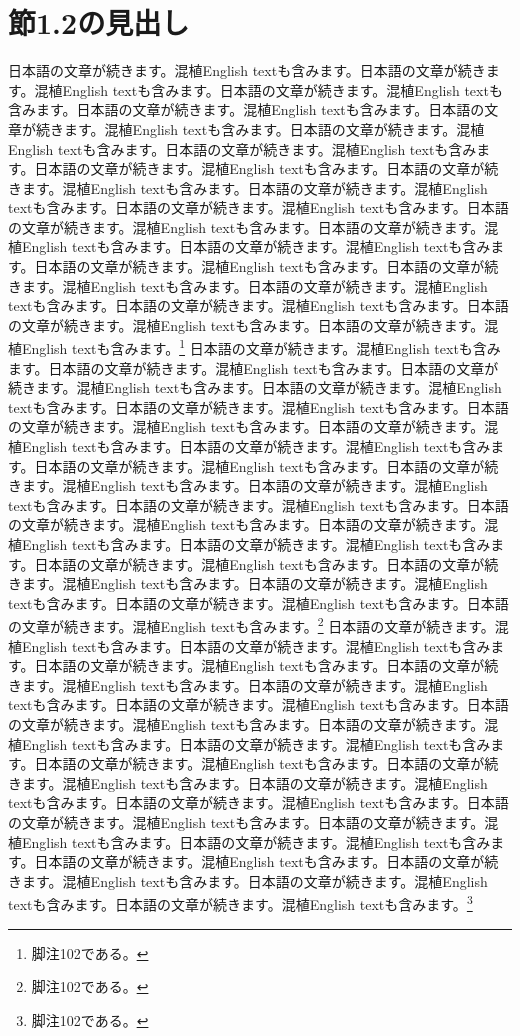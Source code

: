 \documentclass[pdflatex,book]{jlreq}
\begin{document}
\section{節1.2の見出し}
日本語の文章が続きます。混植English textも含みます。日本語の文章が続きます。混植English textも含みます。日本語の文章が続きます。混植English textも含みます。日本語の文章が続きます。混植English textも含みます。日本語の文章が続きます。混植English textも含みます。日本語の文章が続きます。混植English textも含みます。日本語の文章が続きます。混植English textも含みます。日本語の文章が続きます。混植English textも含みます。日本語の文章が続きます。混植English textも含みます。日本語の文章が続きます。混植English textも含みます。日本語の文章が続きます。混植English textも含みます。日本語の文章が続きます。混植English textも含みます。日本語の文章が続きます。混植English textも含みます。日本語の文章が続きます。混植English textも含みます。日本語の文章が続きます。混植English textも含みます。日本語の文章が続きます。混植English textも含みます。日本語の文章が続きます。混植English textも含みます。日本語の文章が続きます。混植English textも含みます。日本語の文章が続きます。混植English textも含みます。日本語の文章が続きます。混植English textも含みます。\footnote{脚注102である。}
日本語の文章が続きます。混植English textも含みます。日本語の文章が続きます。混植English textも含みます。日本語の文章が続きます。混植English textも含みます。日本語の文章が続きます。混植English textも含みます。日本語の文章が続きます。混植English textも含みます。日本語の文章が続きます。混植English textも含みます。日本語の文章が続きます。混植English textも含みます。日本語の文章が続きます。混植English textも含みます。日本語の文章が続きます。混植English textも含みます。日本語の文章が続きます。混植English textも含みます。日本語の文章が続きます。混植English textも含みます。日本語の文章が続きます。混植English textも含みます。日本語の文章が続きます。混植English textも含みます。日本語の文章が続きます。混植English textも含みます。日本語の文章が続きます。混植English textも含みます。日本語の文章が続きます。混植English textも含みます。日本語の文章が続きます。混植English textも含みます。日本語の文章が続きます。混植English textも含みます。日本語の文章が続きます。混植English textも含みます。日本語の文章が続きます。混植English textも含みます。\footnote{脚注102である。}
日本語の文章が続きます。混植English textも含みます。日本語の文章が続きます。混植English textも含みます。日本語の文章が続きます。混植English textも含みます。日本語の文章が続きます。混植English textも含みます。日本語の文章が続きます。混植English textも含みます。日本語の文章が続きます。混植English textも含みます。日本語の文章が続きます。混植English textも含みます。日本語の文章が続きます。混植English textも含みます。日本語の文章が続きます。混植English textも含みます。日本語の文章が続きます。混植English textも含みます。日本語の文章が続きます。混植English textも含みます。日本語の文章が続きます。混植English textも含みます。日本語の文章が続きます。混植English textも含みます。日本語の文章が続きます。混植English textも含みます。日本語の文章が続きます。混植English textも含みます。日本語の文章が続きます。混植English textも含みます。日本語の文章が続きます。混植English textも含みます。日本語の文章が続きます。混植English textも含みます。日本語の文章が続きます。混植English textも含みます。日本語の文章が続きます。混植English textも含みます。\footnote{脚注102である。}
\end{document}
